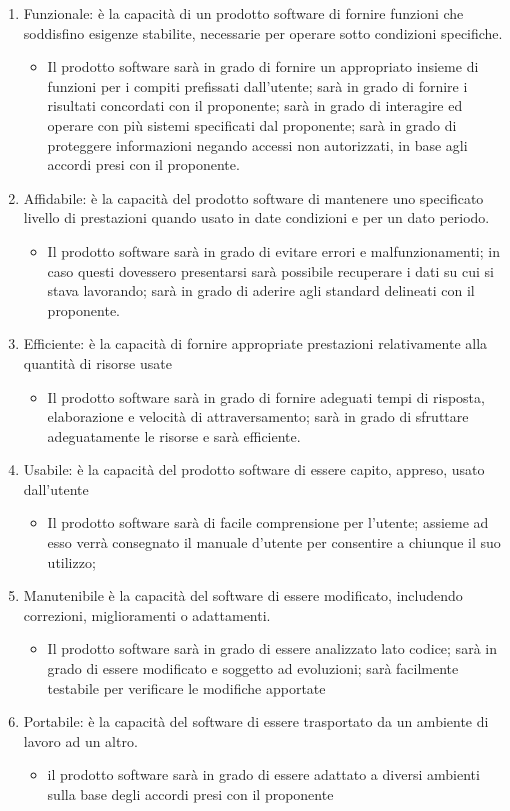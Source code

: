\documentclass[../piano_di_qualifica.tex]{subfiles}
\begin{document}
\begin{enumerate}
\item Funzionale: è la capacità di un prodotto software di fornire funzioni che soddisfino esigenze stabilite, necessarie per operare sotto condizioni specifiche.
	\begin{itemize}
	\item Il prodotto software sarà in grado di fornire un appropriato insieme di funzioni per i compiti prefissati dall’utente; sarà in grado di fornire i risultati concordati con il proponente; sarà in grado di interagire ed operare con più sistemi specificati dal proponente; sarà in grado di proteggere informazioni negando accessi non autorizzati, in base agli accordi presi con il proponente.
	\end{itemize}
\item Affidabile: è la capacità del prodotto software di mantenere uno specificato livello di prestazioni quando usato in date condizioni e per un dato periodo.
	\begin{itemize}
	\item Il prodotto software sarà in grado di evitare errori e malfunzionamenti; in caso questi dovessero presentarsi sarà possibile recuperare i dati su cui si stava lavorando; sarà in grado di aderire agli standard delineati con il proponente.
	\end{itemize}
\item Efficiente: è la capacità di fornire appropriate prestazioni relativamente alla quantità di risorse usate
	\begin{itemize}
	\item Il prodotto software sarà in grado di fornire adeguati tempi di risposta, elaborazione e velocità di attraversamento; sarà in grado di sfruttare adeguatamente le risorse e sarà efficiente.
	\end{itemize}
\item Usabile: è la capacità del prodotto software di essere capito, appreso, usato dall'utente
	\begin{itemize}
	\item Il prodotto software sarà di facile comprensione per l’utente; assieme ad esso verrà consegnato il manuale d’utente per consentire a chiunque il suo utilizzo; 
	\end{itemize}
\item Manutenibile è la capacità del software di essere modificato, includendo correzioni, miglioramenti o adattamenti.
	\begin{itemize}
	\item Il prodotto software sarà in grado di essere analizzato lato codice; sarà in grado di essere modificato e soggetto ad evoluzioni; sarà facilmente testabile per verificare le modifiche apportate
	\end{itemize}
\item Portabile: è la capacità del software di essere trasportato da un ambiente di lavoro ad un altro.
	\begin{itemize}
	\item il prodotto software sarà in grado di essere adattato a diversi ambienti sulla base degli accordi presi con il proponente
	\end{itemize}
\end{enumerate}
\end{document}
